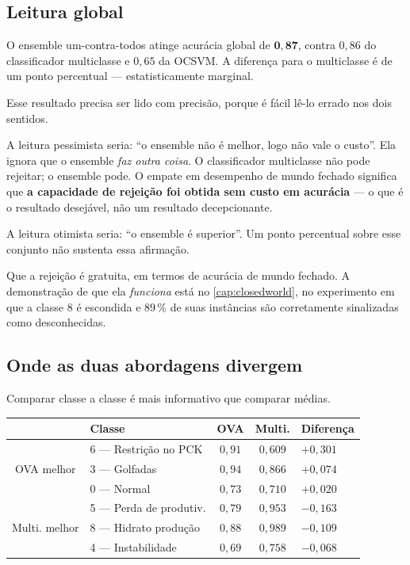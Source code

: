 \subsection{Leitura global}

\begin{resultadochave}
O ensemble um-contra-todos atinge acurácia global de $\bm{0{,}87}$, contra $0{,}86$ do
classificador multiclasse e $0{,}65$ da OCSVM. A diferença para o multiclasse é de um
ponto percentual --- estatisticamente marginal.
\end{resultadochave}

Esse resultado precisa ser lido com precisão, porque é fácil lê-lo errado nos dois
sentidos.

A leitura pessimista seria: ``o ensemble não é melhor, logo não vale o custo''. Ela
ignora que o ensemble \emph{faz outra coisa}. O classificador multiclasse não pode
rejeitar; o ensemble pode. O empate em desempenho de mundo fechado significa que
\textbf{a capacidade de rejeição foi obtida sem custo em acurácia} --- o que é o
resultado desejável, não um resultado decepcionante.

A leitura otimista seria: ``o ensemble é superior''. Um ponto percentual sobre esse
conjunto não sustenta essa afirmação.

\begin{destaque}
Que a rejeição é gratuita, em termos de acurácia de mundo fechado. A demonstração de que
ela \emph{funciona} está no \cref{cap:closedworld}, no experimento em que a classe 8 é
escondida e $89\,\%$ de suas instâncias são corretamente sinalizadas como desconhecidas.
\end{destaque}

\subsection{Onde as duas abordagens divergem}

Comparar classe a classe é mais informativo que comparar médias.

\begin{center}
\small
\begin{tabular}{clcc l}
\toprule
& \textbf{Classe} & \textbf{OVA} & \textbf{Multi.} & \textbf{Diferença} \\
\midrule
\multirow{3}{*}{OVA melhor}
& 6 --- Restrição no PCK   & $0{,}91$ & $0{,}609$ & $+0{,}301$ \\
& 3 --- Golfadas           & $0{,}94$ & $0{,}866$ & $+0{,}074$ \\
& 0 --- Normal             & $0{,}73$ & $0{,}710$ & $+0{,}020$ \\
\midrule
\multirow{3}{*}{Multi. melhor}
& 5 --- Perda de produtiv. & $0{,}79$ & $0{,}953$ & $-0{,}163$ \\
& 8 --- Hidrato produção   & $0{,}88$ & $0{,}989$ & $-0{,}109$ \\
& 4 --- Instabilidade      & $0{,}69$ & $0{,}758$ & $-0{,}068$ \\
\bottomrule
\end{tabular}
\end{center}

